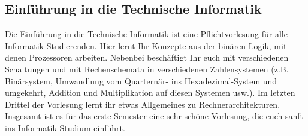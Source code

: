 \subsection{Einführung in die Technische Informatik}
\label{info2}
Die Einführung in die Technische Informatik ist eine Pflichtvorlesung für alle Informatik-Studierenden. Hier lernt Ihr Konzepte aus der binären Logik, mit denen Prozessoren arbeiten. Nebenbei beschäftigt Ihr euch mit verschiedenen Schaltungen und mit Rechenschemata in verschiedenen Zahlensystemen (z.B. Binärsystem, Umwandlung vom Quarternär- ins Hexadezimal-System und umgekehrt, Addition und Multiplikation auf diesen Systemen usw.). Im letzten Drittel der Vorlesung lernt ihr etwas Allgemeines zu Rechnerarchitekturen. Insgesamt ist es für das erste Semester eine sehr schöne Vorlesung, die euch sanft ins Informatik-Studium einführt.
